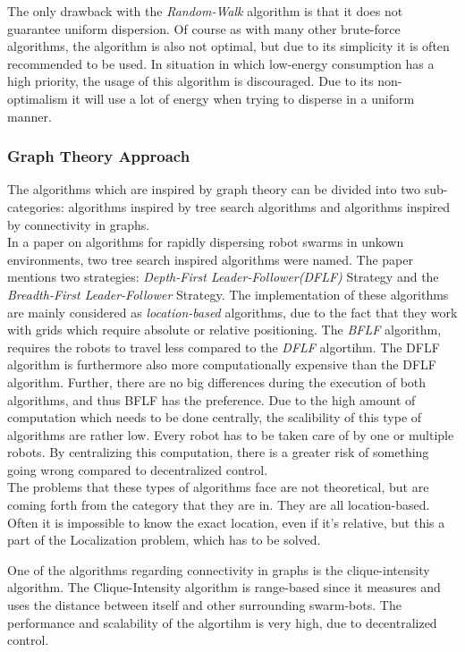 The only drawback with the \emph{Random-Walk} algorithm is that it does not guarantee uniform dispersion.
Of course as with many other brute-force algorithms, the algorithm is also not optimal, but due to its simplicity it is often recommended to be used.
In situation in which low-energy consumption has a high priority, the usage of this algorithm is discouraged. Due to its non-optimalism it will use a lot of energy when trying to disperse in a uniform manner.

\subsubsection{Graph Theory Approach}
The algorithms which are inspired by graph theory can be divided into two sub-categories: algorithms inspired by tree search algorithms and algorithms inspired by connectivity in graphs.\\

In a paper on algorithms for rapidly dispersing robot swarms in unkown environments\cite{hsiang2004algorithms}, two tree search inspired algorithms were named.
The paper mentions two strategies: \emph{Depth-First Leader-Follower(DFLF)} Strategy and the \emph{Breadth-First Leader-Follower} Strategy.
The implementation of these algorithms are mainly considered as \emph{location-based} algorithms, due to the fact that they work with grids which require absolute or relative positioning.
The \emph{BFLF} algorithm, requires the robots to travel less compared to the \emph{DFLF} algortihm. The DFLF algorithm is furthermore also more computationally expensive than the DFLF algorithm.
Further, there are no big differences during the execution of both algorithms, and thus BFLF has the preference.
Due to the high amount of computation which needs to be done centrally, the scalibility of this type of algorithms are rather low.
Every robot has to be taken care of by one or multiple robots. By centralizing this computation, there is a greater risk of something going wrong compared to decentralized control.\\

The problems that these types of algorithms face are not theoretical, but are coming forth from the category that they are in. They are all location-based. Often it is impossible to know the exact location, even if it's relative, but this a part of the Localization problem, which has to be solved.

One of the algorithms regarding connectivity in graphs is the clique-intensity algorithm.\cite{ugur2007dispersion}
The Clique-Intensity algorithm is range-based since it measures and uses the distance between itself and other surrounding swarm-bots.
The performance and scalability of the algortihm is very high, due to decentralized control.

